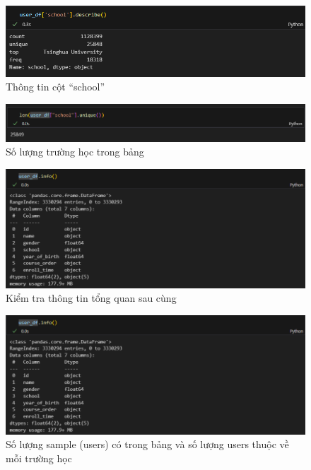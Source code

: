 \newpage
\begin{figure}
    \centering
    \includegraphics[width=1\linewidth]{figures/19.png}
    \caption{Thông tin cột “school”}
\end{figure}
\begin{figure}[h]
    \centering
    \includegraphics[width=1\linewidth]{figures/20.png}
    \caption{Số lượng trường học trong bảng}
\end{figure}
\begin{figure}[h]
    \centering
    \includegraphics[width=1\linewidth]{figures/21.png}
    \caption{Kiểm tra thông tin tổng quan sau cùng}
\end{figure}
\newpage
\begin{figure}
    \centering
    \includegraphics[width=1\linewidth]{figures/22.png}
    \caption{Số lượng sample (users) có trong bảng và số lượng users thuộc về mỗi trường học}
\end{figure}
